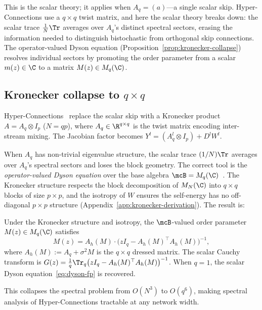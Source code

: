 This is the scalar theory; it applies when $A_q = (a)$---a single scalar skip. Hyper-Connections use a $q \times q$ twist matrix, and here the scalar theory breaks down: the scalar trace $\frac{1}{N}\Tr$ averages over $A_q$'s distinct spectral sectors, erasing the information needed to distinguish bistochastic from orthogonal skip connections. The operator-valued Dyson equation (Proposition~\ref{prop:kronecker-collapse}) resolves individual sectors by promoting the order parameter from a scalar $m(z) \in \C$ to a matrix $M(z) \in M_q(\C)$.

\subsection{Kronecker collapse to $q \times q$}\label{sec:kronecker-skip}

Hyper-Connections~\cite{zhu2024hyperconnections} replace the scalar skip with a Kronecker product $A = A_q \otimes I_p$ ($N = qp$), where $A_q \in \R^{q \times q}$ is the twist matrix encoding inter-stream mixing. The Jacobian factor becomes $Y^l = (A_q^l \otimes I_p) + D^l W^l$.

When $A_q$ has non-trivial eigenvalue structure, the scalar trace $(1/N)\Tr$ averages over $A_q$'s spectral sectors and loses the block geometry. The correct tool is the \emph{operator-valued Dyson equation} over the base algebra $\mcB = M_q(\C)$~\cite{voiculescu1995operations,speicher1998combinatorial}. The Kronecker structure respects the block decomposition of $M_N(\C)$ into $q \times q$ blocks of size $p \times p$, and the isotropy of $W$ ensures the self-energy has no off-diagonal $p \times p$ structure (Appendix~\ref{app:kronecker-derivation}). The result is:

\begin{proposition}\label{prop:kronecker-collapse}
Under the Kronecker structure and isotropy, the $\mcB$-valued order parameter $M(z) \in M_q(\C)$ satisfies
\begin{equation}\label{eq:matrix-dyson}
M(z) = A_h(M) \cdot \bigl(zI_q - A_h(M)^\top A_h(M)\bigr)^{-1},
\end{equation}
where $A_h(M) := A_q + \sigma^2 M$ is the $q \times q$ dressed matrix. The scalar Cauchy transform is $G(z) = \frac{1}{q}\Tr_q\bigl(zI_q - A_h(M)^\top A_h(M)\bigr)^{-1}$. When $q = 1$, the scalar Dyson equation~\eqref{eq:dyson-fp} is recovered.
\end{proposition}

\noindent This collapses the spectral problem from $O(N^3)$ to $O(q^6)$, making spectral analysis of Hyper-Connections tractable at any network width.

